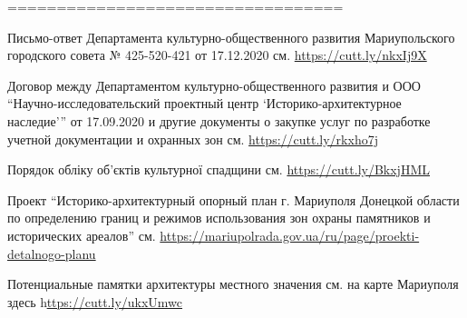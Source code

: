 ==================================

\begin{minipage}{0.9\textwidth}
Письмо-ответ Департамента культурно-общественного развития Мариупольского
городского совета № 425-520-421 от 17.12.2020 см. \url{https://cutt.ly/nkxIj9X}

Договор между Департаментом культурно-общественного развития и ООО
\enquote{Научно-исследовательский проектный центр \enquote{Историко-архитектурное наследие}} от
17.09.2020 и другие документы о закупке услуг по разработке учетной
документации и охранных зон см. \url{https://cutt.ly/rkxho7j}

Порядок обліку об'єктів культурної спадщини см. \url{https://cutt.ly/BkxjHML}

Проект \enquote{Историко-архитектурный опорный план г. Мариуполя Донецкой области по
определению границ и режимов использования зон охраны памятников и исторических
ареалов} см. \url{https://mariupolrada.gov.ua/ru/page/proekti-detalnogo-planu}

Потенциальные памятки архитектуры местного значения см. на карте Мариуполя
здесь h\url{ttps://cutt.ly/ukxUmwc}
\end{minipage}

